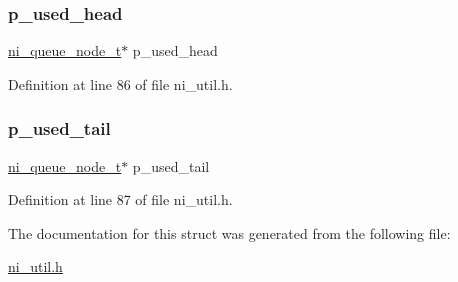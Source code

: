 \subsubsection{\texorpdfstring{p\_used\_head}{p\_used\_head}}
{\footnotesize\ttfamily \mbox{\hyperlink{ni__util_8h_aecbc45db1f33b1a7eb1b32a6be3e7cce}{ni\+\_\+queue\+\_\+node\+\_\+t}}$\ast$ p\+\_\+used\+\_\+head}



Definition at line 86 of file ni\+\_\+util.\+h.

\mbox{\label{struct__ni__queue__buffer__pool__t_a74da1fe945fd27fdfd4d644670f29058}} 
\subsubsection{\texorpdfstring{p\_used\_tail}{p\_used\_tail}}
{\footnotesize\ttfamily \mbox{\hyperlink{ni__util_8h_aecbc45db1f33b1a7eb1b32a6be3e7cce}{ni\+\_\+queue\+\_\+node\+\_\+t}}$\ast$ p\+\_\+used\+\_\+tail}



Definition at line 87 of file ni\+\_\+util.\+h.



The documentation for this struct was generated from the following file\+:\begin{DoxyCompactItemize}
\item 
\mbox{\hyperlink{ni__util_8h}{ni\+\_\+util.\+h}}\end{DoxyCompactItemize}
